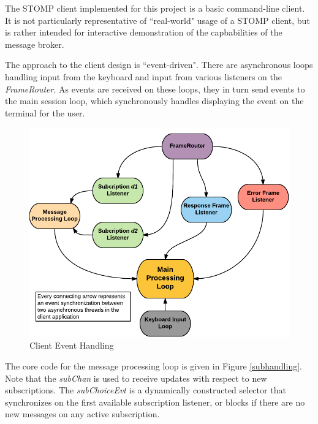 \documentclass[conference, letterpaper]{IEEEtran}
\begin{document}
The STOMP client implemented for this project is a basic command-line client. It is not particularly representative of ``real-world" usage of a STOMP client, but is rather intended for interactive demonstration of the capbabilities of the message broker.

The approach to the client design is ``event-driven". There are asynchronous loops handling input from the keyboard and input from various listeners on the \textit{FrameRouter}. As events are received on these loops, they in turn send events to the main session loop, which synchronously handles displaying the event on the terminal for the user.

\begin{figure}[h]
        \centering
        \ifCLASSINFOpdf
             \includegraphics[scale=.65]{client_event.pdf}
         \else
        \fi
        \caption{Client Event Handling}
        \label{stompsend}
    \end{figure}

The core code for the message processing loop is given in Figure \ref{subhandling}. Note that the \textit{subChan} is used to receive updates with respect to new subscriptions. The \textit{subChoiceEvt} is a dynamically constructed selector that synchronizes on the first available subscription listener, or blocks if there are no new messages on any active subscription.
\end{document}

